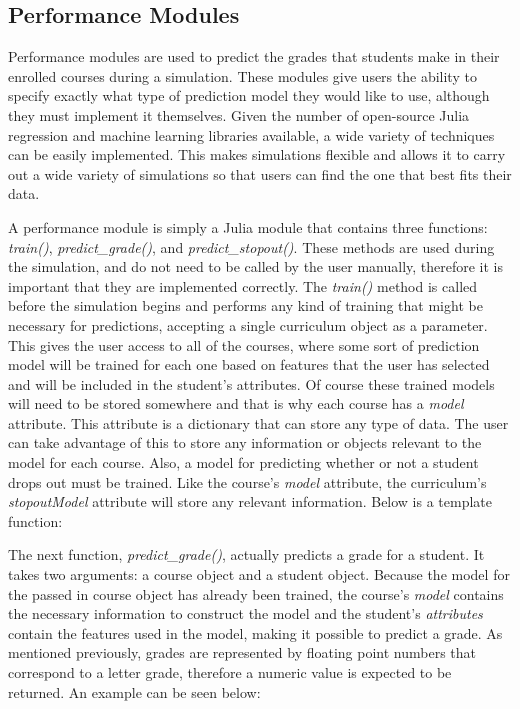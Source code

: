 \documentclass[botnum, fleqn]{unmeethesis}
\begin{document}
    \subsection{Performance Modules}
      Performance modules are used to predict the grades that students make in their enrolled courses during a simulation. These modules give users the ability to specify exactly what type of prediction model they would like to use, although they must implement it themselves. Given the number of open-source Julia regression and machine learning libraries available, a wide variety of techniques can be easily implemented. This makes simulations flexible and allows it to carry out a wide variety of simulations so that users can find the one that best fits their data. 

      A performance module is simply a Julia module that contains three functions: \textit{train()}, \textit{predict\_grade()}, and \textit{predict\_stopout()}. These methods are used during the simulation, and do not need to be called by the user manually, therefore it is important that they are implemented correctly. The \textit{train()} method is called before the simulation begins and performs any kind of training that might be necessary for predictions, accepting a single curriculum object as a parameter. This gives the user access to all of the courses, where some sort of prediction model will be trained for each one based on features that the user has selected and will be included in the student's attributes. Of course these trained models will need to be stored somewhere and that is why each course has a \textit{model} attribute. This attribute is a dictionary that can store any type of data. The user can take advantage of this to store any information or objects relevant to the model for each course. Also, a model for predicting whether or not a student drops out must be trained. Like the course's \textit{model} attribute, the curriculum's \textit{stopoutModel} attribute will store any relevant information. Below is a template function:

      

      The next function, \textit{predict\_grade()}, actually predicts a grade for a student. It takes two arguments: a course object and a student object. Because the model for the passed in course object has already been trained, the course's \textit{model} contains the necessary information to construct the model and the student's \textit{attributes} contain the features used in the model, making it possible to predict a grade. As mentioned previously, grades are represented by floating point numbers that correspond to a letter grade, therefore a numeric value is expected to be returned. An example can be seen below:
\end{document}

